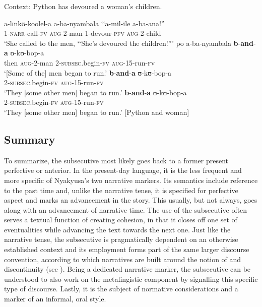 \begin{exe}
\ex \label{exSubsecutiveRepetition} Context: Python has devoured a woman's children.
\begin{xlist}
\ex \gll a-lɪnkʊ-koolel-a a-ba-nyambala \textup{\lq\lq}a-mil-ile a-ba-ana!\textup{''}\\
1-\textsc{narr}-call-\textsc{fv} \textsc{aug}-2-man \phantom{\lq\lq}1-devour-\textsc{pfv} \textsc{aug}-2-child\\
\glt \lq She called to the men, \lq\lq She's devoured the children!''{}'
\ex \label{exSubsecutiveRepetitionSentence2}
\gll po a-ba-nyambala \textbf{b}-\textbf{and}-\textbf{a} ʊ-kʊ-bop-a\\
then \textsc{aug}-2-man 2-\textsc{subsec}.begin-\textsc{fv} \textsc{aug}-15-run-\textsc{fv}\\
\glt \lq [Some of the] men began to run.'
\ex \label{exSubsecutiveRepetitionSentence3} \gll \textbf{b}-\textbf{and}-\textbf{a} ʊ-kʊ-bop-a\\
2-\textsc{subsec}.begin-\textsc{fv} \textsc{aug}-15-run-\textsc{fv}\\
\glt \lq They [some other men] began to run.'
\ex \label{exSubsecutiveRepetitionSentence4}\gll \textbf{b}-\textbf{and}-\textbf{a} ʊ-kʊ-bop-a\\
2-\textsc{subsec}.begin-\textsc{fv} \textsc{aug}-15-run-\textsc{fv}\\
\glt \lq They [some other men] began to run.' [Python and woman]
\end{xlist}
\end{exe}

\subsection{Summary}
To summarize, the subsecutive most likely goes back to a former present perfective or anterior. In the present-day language, it is the less frequent and more specific of Nyakyusa's two narrative markers. Its semantics include reference to the past time and, unlike the narrative tense, it is specified for perfective aspect and marks an advancement in the story. This usually, but not always, goes along with an advancement of narrative time. The use of the subsecutive often serves a textual function of creating cohesion, in that it closes off one set of eventualities while advancing the text towards the next one. Just like the narrative tense, the subsecutive is pragmatically dependent on an otherwise established context and its employment forms part of the same larger discourse convention, according to which narratives are built around the notion of  and discontinuity (see ). Being a dedicated narrative marker, the subsecutive can be understood to also work on the metalingistic component by signalling this specific type of discourse. Lastly, it is the subject of normative considerations and a marker of an informal, oral style.
